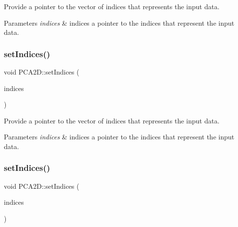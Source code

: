 Provide a pointer to the vector of indices that represents the input data. 


\begin{DoxyParams}{Parameters}
{\em indices} & indices a pointer to the indices that represent the input data. \\
\hline
\end{DoxyParams}
\mbox{\label{classPCA2D_a51c7a6bcf7c77af6d81d98a0bb0186a6}} 
\subsubsection{\texorpdfstring{set\+Indices()}{setIndices()}\hspace{0.1cm}{\footnotesize\ttfamily [3/5]}}
{\footnotesize\ttfamily void P\+C\+A2\+D\+::set\+Indices (\begin{DoxyParamCaption}\item[{const pcl\+::\+Point\+Indices\+Const\+Ptr \&}]{indices }\end{DoxyParamCaption})}



Provide a pointer to the vector of indices that represents the input data. 


\begin{DoxyParams}{Parameters}
{\em indices} & indices a pointer to the indices that represent the input data. \\
\hline
\end{DoxyParams}
\mbox{\label{classPCA2D_a4e7f046e1198928994dfc40a4c3be40e}} 
\subsubsection{\texorpdfstring{set\+Indices()}{setIndices()}\hspace{0.1cm}{\footnotesize\ttfamily [4/5]}}
{\footnotesize\ttfamily void P\+C\+A2\+D\+::set\+Indices (\begin{DoxyParamCaption}\item[{const boost\+::shared\+\_\+ptr$<$ std\+::vector$<$ int $>$$>$ \&}]{indices }\end{DoxyParamCaption})}



